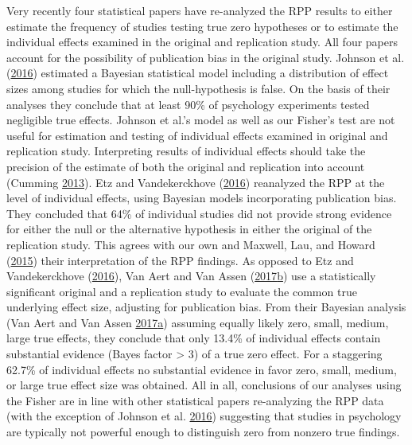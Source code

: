 \documentclass[a5paper]{book}
\begin{document}
Very recently four statistical papers have re-analyzed the RPP results
to either estimate the frequency of studies testing true zero hypotheses
or to estimate the individual effects examined in the original and
replication study. All four papers account for the possibility of
publication bias in the original study. Johnson et al.
(\protect\hyperlink{ref-doi:10.1080ux2f01621459.2016.1240079}{2016})
estimated a Bayesian statistical model including a distribution of
effect sizes among studies for which the null-hypothesis is false. On
the basis of their analyses they conclude that at least 90\% of
psychology experiments tested negligible true effects. Johnson et al.'s
model as well as our Fisher's test are not useful for estimation and
testing of individual effects examined in original and replication
study. Interpreting results of individual effects should take the
precision of the estimate of both the original and replication into
account (Cumming
\protect\hyperlink{ref-doi:10.1177ux2f0956797613504966}{2013}). Etz and
Vandekerckhove
(\protect\hyperlink{ref-doi:10.1371ux2fjournal.pone.0149794}{2016})
reanalyzed the RPP at the level of individual effects, using Bayesian
models incorporating publication bias. They concluded that 64\% of
individual studies did not provide strong evidence for either the null
or the alternative hypothesis in either the original of the replication
study. This agrees with our own and Maxwell, Lau, and Howard
(\protect\hyperlink{ref-doi:10.1037ux2fa0039400}{2015}) their
interpretation of the RPP findings. As opposed to Etz and Vandekerckhove
(\protect\hyperlink{ref-doi:10.1371ux2fjournal.pone.0149794}{2016}), Van
Aert and Van Assen
(\protect\hyperlink{ref-doi:10.3758ux2fs13428-017-0967-6}{2017}\protect\hyperlink{ref-doi:10.3758ux2fs13428-017-0967-6}{b})
use a statistically significant original and a replication study to
evaluate the common true underlying effect size, adjusting for
publication bias. From their Bayesian analysis (Van Aert and Van Assen
\protect\hyperlink{ref-doi:10.1371ux2fjournal.pone.0175302}{2017}\protect\hyperlink{ref-doi:10.1371ux2fjournal.pone.0175302}{a})
assuming equally likely zero, small, medium, large true effects, they
conclude that only 13.4\% of individual effects contain substantial
evidence (Bayes factor \textgreater{} 3) of a true zero effect. For a
staggering 62.7\% of individual effects no substantial evidence in favor
zero, small, medium, or large true effect size was obtained. All in all,
conclusions of our analyses using the Fisher are in line with other
statistical papers re-analyzing the RPP data (with the exception of
Johnson et al.
\protect\hyperlink{ref-doi:10.1080ux2f01621459.2016.1240079}{2016})
suggesting that studies in psychology are typically not powerful enough
to distinguish zero from nonzero true findings.
\end{document}
